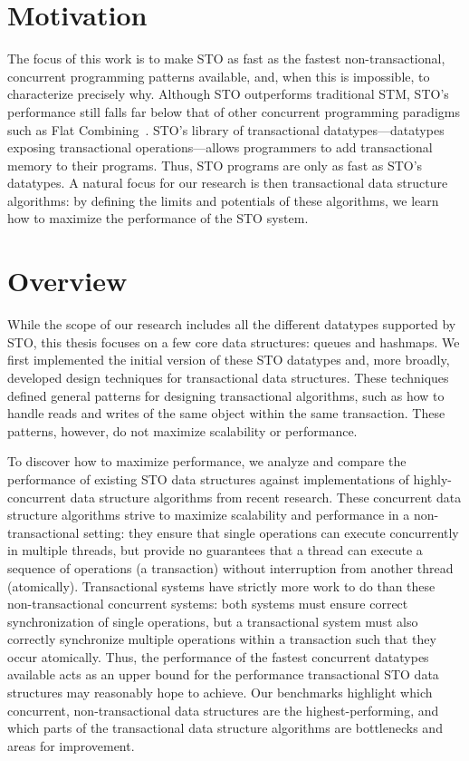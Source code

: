 \section{Motivation}
The focus of this work is to make STO as fast as the fastest non-transactional, concurrent programming patterns available, and, when this is impossible, to characterize precisely why. Although STO outperforms traditional STM, STO’s performance still falls far below that of other concurrent programming paradigms such as Flat Combining~\cite{flatcombining}. STO’s library of transactional datatypes---datatypes exposing transactional operations---allows programmers to add transactional memory to their programs. Thus, STO programs are only as fast as STO's datatypes. A natural focus for our research is then transactional data structure algorithms: by defining the limits and potentials of these algorithms, we learn how to maximize the performance of the STO system.

\section{Overview}
While the scope of our research includes all the different datatypes supported by STO, this thesis focuses on a few core data structures: queues and hashmaps. We first implemented the initial version of these STO datatypes and, more broadly, developed design techniques for transactional data structures. These techniques defined general patterns for designing transactional algorithms, such as how to handle reads and writes of the same object within the same transaction. These patterns, however, do not maximize scalability or performance.

To discover how to maximize performance, we analyze and compare the performance of existing STO data structures against implementations of highly-concurrent data structure algorithms from recent research. These concurrent data structure algorithms strive to maximize scalability and performance in a non-transactional setting: they ensure that single operations can execute concurrently in multiple threads, but provide no guarantees that a thread can execute a sequence of operations (a transaction) without interruption from another thread (atomically).
Transactional systems have strictly more work to do than these non-transactional concurrent systems: both systems must ensure correct synchronization of single operations, but a transactional system must also correctly synchronize multiple operations within a transaction such that they occur atomically.
Thus, the performance of the fastest concurrent datatypes available acts as an upper bound for the performance transactional STO data structures may reasonably hope to achieve. Our benchmarks highlight which concurrent, non-transactional data structures are the highest-performing, and which parts of the transactional data structure algorithms are bottlenecks and areas for improvement. 

